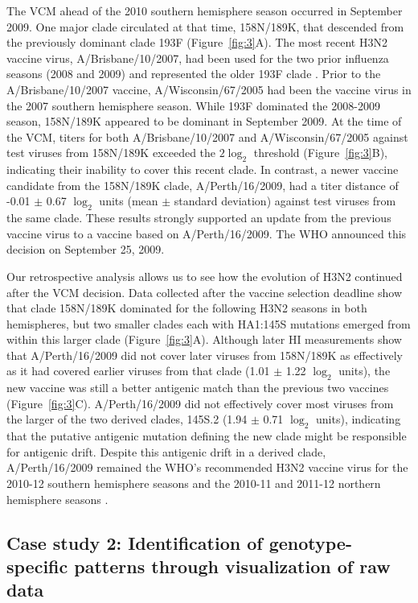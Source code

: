 \documentclass[utf8]{FrontiersinHarvard} %
\begin{document}
The VCM ahead of the 2010 southern hemisphere season occurred in September 2009.
One major clade circulated at that time, 158N/189K, that descended from the previously dominant clade 193F (Figure~\ref{fig:3}A).
The most recent H3N2 vaccine virus, A/Brisbane/10/2007, had been used for the two prior influenza seasons (2008 and 2009) and represented the older 193F clade \citep{WHO:archive}.
Prior to the A/Brisbane/10/2007 vaccine, A/Wisconsin/67/2005 had been the vaccine virus in the 2007 southern hemisphere season.
While 193F dominated the 2008-2009 season, 158N/189K appeared to be dominant in September 2009.
At the time of the VCM, titers for both A/Brisbane/10/2007 and A/Wisconsin/67/2005 against test viruses from 158N/189K exceeded the $2\log_{2}$ threshold (Figure~\ref{fig:3}B), indicating their inability to cover this recent clade.
In contrast, a newer vaccine candidate from the 158N/189K clade, A/Perth/16/2009, had a titer distance of -0.01 $\pm$ 0.67 $\log_{2}$ units (mean $\pm$ standard deviation) against test viruses from the same clade.
These results strongly supported an update from the previous vaccine virus to a vaccine based on A/Perth/16/2009.
The WHO announced this decision on September 25, 2009.

Our retrospective analysis allows us to see how the evolution of H3N2 continued after the VCM decision.
Data collected after the vaccine selection deadline show that clade 158N/189K dominated for the following H3N2 seasons in both hemispheres, but two smaller clades each with HA1:145S mutations emerged from within this larger clade (Figure~\ref{fig:3}A).
Although later HI measurements show that A/Perth/16/2009 did not cover later viruses from 158N/189K as effectively as it had covered earlier viruses from that clade (1.01 $\pm$ 1.22 $\log_{2}$ units), the new vaccine was still a better antigenic match than the previous two vaccines (Figure~\ref{fig:3}C).
A/Perth/16/2009 did not effectively cover most viruses from the larger of the two derived clades, 145S.2 (1.94 $\pm$ 0.71 $\log_{2}$ units), indicating that the putative antigenic mutation defining the new clade might be responsible for antigenic drift.
Despite this antigenic drift in a derived clade, A/Perth/16/2009 remained the WHO's recommended H3N2 vaccine virus for the 2010-12 southern hemisphere seasons and the 2010-11 and 2011-12 northern hemisphere seasons \citep{WHO:recent}.

\subsection{Case study 2: Identification of genotype-specific patterns through visualization of raw data}
\end{document}
